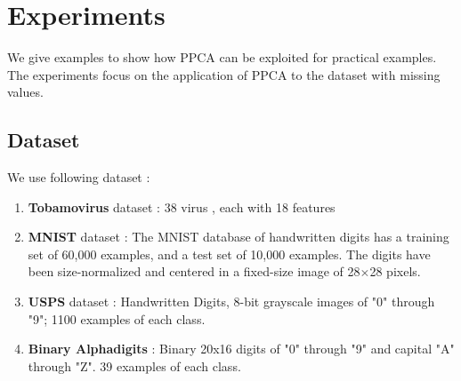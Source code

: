 \chapter{Experiments}
We give examples to show how PPCA can be exploited for practical examples. The experiments focus on the application of PPCA to the dataset with missing values.


\section{Dataset}
We use following dataset :
\begin{enumerate}
\item \textbf{Tobamovirus} dataset : 38 virus , each with 18 features
\item \textbf{MNIST} dataset : The MNIST database of handwritten digits has a training set of 60,000 examples, and a test set of 10,000 examples. The digits have been size-normalized and centered in a fixed-size image of 28$\times$28 pixels. 
\item \textbf{USPS} dataset : Handwritten Digits, 8-bit grayscale images of "0" through "9"; 1100 examples of each class. 
\item \textbf{Binary Alphadigits} : Binary 20x16 digits of "0" through "9" and capital "A" through "Z". 39 examples of each class.
\end{enumerate}

